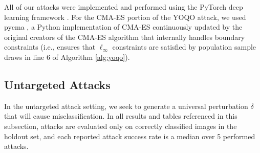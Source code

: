 \documentclass[letterpaper]{article}
\begin{document}
	
	
	All of our attacks were implemented and performed using the PyTorch deep learning framework \cite{paszke2019pytorch}. For the CMA-ES portion of the YOQO attack, we used pycma \cite{hansen2019pycma}, a Python implementation of CMA-ES continuously updated by the original creators of the CMA-ES algorithm that internally handles boundary constraints (i.e., ensures that $\ell_\infty$ constraints are satisfied by population sample draws in line 6 of Algorithm \ref{alg:yoqo}).
	
	\subsection{Untargeted Attacks}
	
	In the untargeted attack setting, we seek to generate a universal perturbation $\delta$ that will cause misclassification. In all results and tables referenced in this subsection, attacks are evaluated only on correctly classified images in the holdout set, and each reported attack success rate is a median over 5 performed attacks.
	
\end{document}
